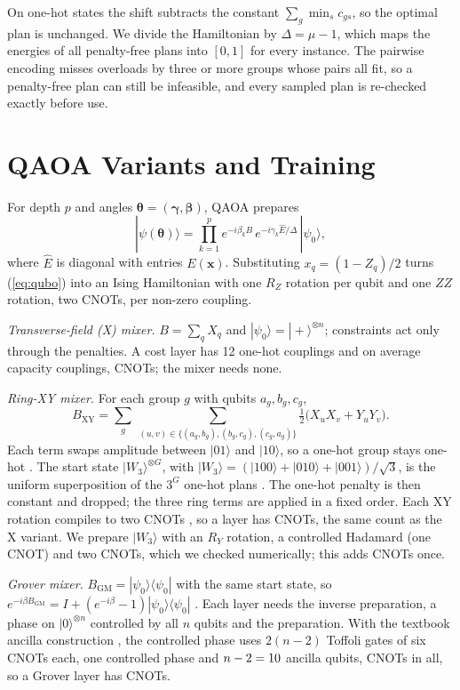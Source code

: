 \documentclass[conference]{IEEEtran}
\begin{document}
On one-hot states the shift subtracts the constant $\sum_g\min_s c_{gs}$, so the optimal plan is unchanged. We divide the Hamiltonian by $\Delta=\mu-1$, which maps the energies of all penalty-free plans into $[0,1]$ for every instance. The pairwise encoding misses overloads by three or more groups whose pairs all fit, so a penalty-free plan can still be infeasible, and every sampled plan is re-checked exactly before use.

\section{QAOA Variants and Training}
For depth $p$ and angles $\boldsymbol\theta=(\boldsymbol\gamma,\boldsymbol\beta)$, QAOA prepares
\begin{equation}
|\psi(\boldsymbol\theta)\rangle=\prod_{k=1}^{p}e^{-i\beta_k B}\,e^{-i\gamma_k \hat E/\Delta}\,|\psi_0\rangle,
\end{equation}
where $\hat E$ is diagonal with entries $E(\mathbf{x})$. Substituting $x_q=(1-Z_q)/2$ turns (\ref{eq:qubo}) into an Ising Hamiltonian with one $R_Z$ rotation per qubit and one $ZZ$ rotation, two CNOTs, per non-zero coupling.

\textit{Transverse-field (X) mixer.} $B=\sum_q X_q$ and $|\psi_0\rangle=|+\rangle^{\otimes n}$; constraints act only through the penalties. A cost layer has 12 one-hot couplings and on average \OvPairs{} capacity couplings, \CnotX{} CNOTs; the mixer needs none.

\textit{Ring-XY mixer.} For each group $g$ with qubits $a_g,b_g,c_g$,
\begin{equation}
B_{\mathrm{XY}}=\sum_{g}\ \sum_{(u,v)\in\{(a_g,b_g),(b_g,c_g),(c_g,a_g)\}}\tfrac12\big(X_uX_v+Y_uY_v\big).
\label{eq:xy}
\end{equation}
Each term swaps amplitude between $|01\rangle$ and $|10\rangle$, so a one-hot group stays one-hot \cite{WangZ2020}. The start state $|W_3\rangle^{\otimes G}$, with $|W_3\rangle=(|100\rangle+|010\rangle+|001\rangle)/\sqrt3$, is the uniform superposition of the $3^G$ one-hot plans \cite{Bartschi2019}. The one-hot penalty is then constant and dropped; the three ring terms are applied in a fixed order. Each XY rotation compiles to two CNOTs \cite{Vatan2004}, so a layer has \CnotXY{} CNOTs, the same count as the X variant. We prepare $|W_3\rangle$ with an $R_Y$ rotation, a controlled Hadamard (one CNOT) and two CNOTs, which we checked numerically; this adds \CnotW{} CNOTs once.

\textit{Grover mixer.} $B_{\mathrm{GM}}=|\psi_0\rangle\langle\psi_0|$ with the same start state, so $e^{-i\beta B_{\mathrm{GM}}}=I+(e^{-i\beta}-1)|\psi_0\rangle\langle\psi_0|$ \cite{Bartschi2020}. Each layer needs the inverse preparation, a phase on $|0\rangle^{\otimes n}$ controlled by all $n$ qubits and the preparation. With the textbook ancilla construction \cite{Nielsen2010}, the controlled phase uses $2(n-2)$ Toffoli gates of six CNOTs each, one controlled phase and $n-2=10$ ancilla qubits, \CnotMCP{} CNOTs in all, so a Grover layer has \CnotGM{} CNOTs.
\end{document}
